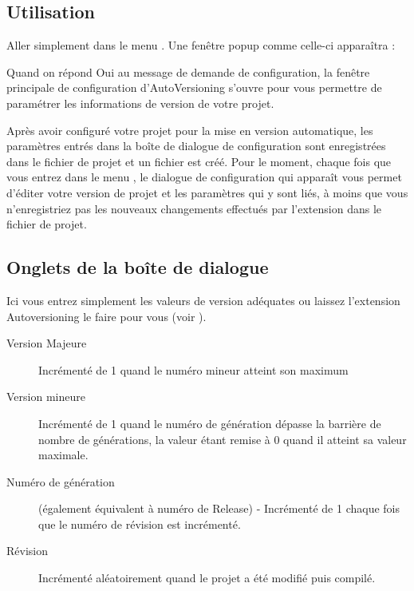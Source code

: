 \subsection{Utilisation}

Aller simplement dans le menu . Une fenêtre popup comme celle-ci apparaîtra :


Quand on répond Oui au message de demande de configuration, la fenêtre principale de configuration d'AutoVersioning s'ouvre pour vous permettre de paramétrer les informations de version de votre projet.

Après avoir configuré votre projet pour la mise en version automatique, les paramètres entrés dans la boîte de dialogue de configuration sont enregistrées dans le fichier de projet et un fichier  est créé. Pour le moment, chaque fois que vous entrez dans le menu , le dialogue de configuration qui apparaît vous permet d'éditer votre version de projet et les paramètres qui y sont liés, à moins que vous n'enregistriez pas les nouveaux changements effectués par l'extension dans le fichier de projet.

\subsection{Onglets de la boîte de dialogue}

Ici vous entrez simplement les valeurs de version adéquates ou laissez l'extension Autoversioning le faire pour vous (voir ).

\begin{description}
\item[Version Majeure] Incrémenté de 1 quand le numéro mineur atteint son maximum
\item[Version mineure] Incrémenté de 1 quand le numéro de génération dépasse la barrière de nombre de générations, la valeur étant remise à 0 quand il atteint sa valeur maximale.
\item[Numéro de génération] (également équivalent à numéro de Release) - Incrémenté de 1 chaque fois que le numéro de révision est incrémenté.
\item[Révision] Incrémenté aléatoirement quand le projet a été modifié puis compilé.
\end{description}

